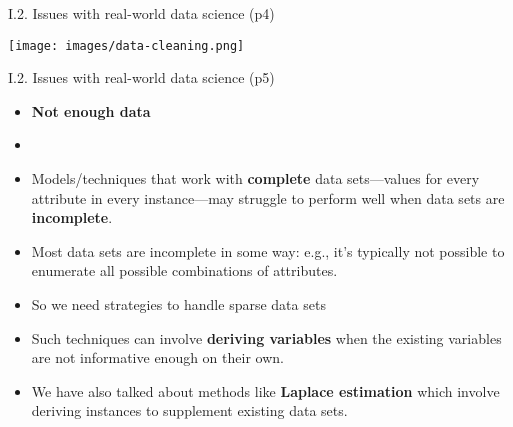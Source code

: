 \documentclass[handout]{beamer}
\newcommand{\strong}[1]{\textbf{\color{teal} #1}}
\begin{document}
\begin{frame}{I.2. Issues with real-world data science (p4)}
\begin{center}
\texttt{[image: images/data-cleaning.png]} 
\end{center}
\end{frame}
\begin{frame}{I.2. Issues with real-world data science (p5)}
\begin{itemize}
\item[] \strong{Not enough data}
\item[]
\item Models/techniques that work with \strong{complete} data sets---values for every attribute in every instance---may struggle to perform well when data sets are \strong{incomplete}.
\item Most data sets are incomplete in some way: e.g., it's typically not possible to enumerate all possible combinations of attributes.
\item So we need strategies to handle sparse data sets
\item Such techniques can involve \strong{deriving variables} when the existing variables are not informative enough on their own.
\item We have also talked about methods like \strong{Laplace estimation} which involve deriving instances to supplement existing data sets.
\end{itemize}
\end{frame}
\end{document}
